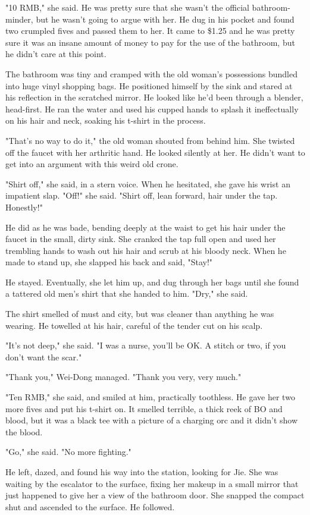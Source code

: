 "10 RMB," she said. He was pretty sure that she wasn't the official
bathroom-minder, but he wasn't going to argue with her. He dug in
his pocket and found two crumpled fives and passed them to her. It
came to \$1.25 and he was pretty sure it was an insane amount of
money to pay for the use of the bathroom, but he didn't care at
this point.

The bathroom was tiny and cramped with the old woman's possessions
bundled into huge vinyl shopping bags. He positioned himself by the
sink and stared at his reflection in the scratched mirror. He
looked like he'd been through a blender, head-first. He ran the
water and used his cupped hands to splash it ineffectually on his
hair and neck, soaking his t-shirt in the process.

"That's no way to do it," the old woman shouted from behind him.
She twisted off the faucet with her arthritic hand. He looked
silently at her. He didn't want to get into an argument with this
weird old crone.

"Shirt off," she said, in a stern voice. When he hesitated, she
gave his wrist an impatient slap. "Off!" she said. "Shirt off, lean
forward, hair under the tap. Honestly!"

He did as he was bade, bending deeply at the waist to get his hair
under the faucet in the small, dirty sink. She cranked the tap full
open and used her trembling hands to wash out his hair and scrub at
his bloody neck. When he made to stand up, she slapped his back and
said, "Stay!"

He stayed. Eventually, she let him up, and dug through her bags
until she found a tattered old men's shirt that she handed to him.
"Dry," she said.

The shirt smelled of must and city, but was cleaner than anything
he was wearing. He towelled at his hair, careful of the tender cut
on his scalp.

"It's not deep," she said. "I was a nurse, you'll be OK. A stitch
or two, if you don't want the scar."

"Thank you," Wei-Dong managed. "Thank you very, very much."

"Ten RMB," she said, and smiled at him, practically toothless. He
gave her two more fives and put his t-shirt on. It smelled
terrible, a thick reek of BO and blood, but it was a black tee with
a picture of a charging orc and it didn't show the blood.

"Go," she said. "No more fighting."

He left, dazed, and found his way into the station, looking for
Jie. She was waiting by the escalator to the surface, fixing her
makeup in a small mirror that just happened to give her a view of
the bathroom door. She snapped the compact shut and ascended to the
surface. He followed.

